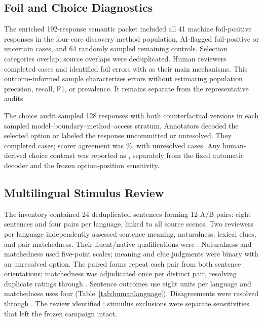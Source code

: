 \subsection{Foil and Choice Diagnostics}
The enriched 192-response semantic packet included all 41 machine foil-positive responses in the four-core discovery method population, AI-flagged foil-positive or uncertain cases, and 64 randomly sampled remaining controls. Selection categories overlap; source overlaps were deduplicated. Human reviewers completed  cases and identified  foil errors with  as their main mechanisms. This outcome-informed sample characterizes errors without estimating population precision, recall, F1, or prevalence. It remains separate from the representative audits.

The choice audit sampled 128 responses with both counterfactual versions in each sampled model--boundary--method--access stratum. Annotators decoded the selected option or labeled the response uncommitted or unresolved. They completed  cases; scorer agreement was \mbox{}\%, with  unresolved cases. Any human-derived choice contrast was reported as , separately from the fixed automatic decoder and the frozen option-position sensitivity.

\subsection{Multilingual Stimulus Review}
The inventory contained 24 deduplicated sentences forming 12 A/B pairs: eight sentences and four pairs per language, linked to all source scenes. Two reviewers per language independently assessed sentence meaning, naturalness, lexical clues, and pair matchedness. Their fluent/native qualifications were . Naturalness and matchedness used five-point scales; meaning and clue judgments were binary with an unresolved option. The paired forms repeat each pair from both sentence orientations; matchedness was adjudicated once per distinct pair, resolving duplicate ratings through . Sentence outcomes use eight units per language and matchedness uses four (Table~\ref{tab:humanlanguage}). Disagreements were resolved through . The review identified ; stimulus exclusions were separate sensitivities that left the frozen campaign intact.

